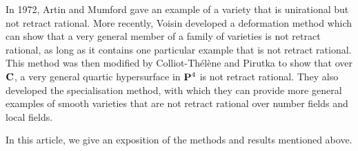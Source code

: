 In 1972, Artin and Mumford \cite{artin-mumford}
gave an example of a variety that is unirational but not retract rational.
More recently, Voisin \cite{voisin}
developed a deformation method which can show that 
a very general member of a family of varieties is not retract rational,
as long as it contains one particular example that is not retract rational.
This method was then modified by Colliot-Thélène and Pirutka \cite{CTP}
to show that over $\bbC$, a very general quartic hypersurface in $\bbP^4$
is not retract rational.
They also developed the specialisation method,
with which they can provide more general examples of smooth varieties
that are not retract rational
over number fields and local fields.

In this article, we give an exposition of
the methods and results mentioned above.

